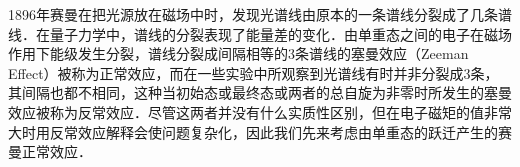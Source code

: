 
\begin{issues}
\issueTODO
\end{issues}


1896年赛曼在把光源放在磁场中时，发现光谱线由原本的一条谱线分裂成了几条谱线．在量子力学中，谱线的分裂表现了能量差的变化．由单重态之间的电子在磁场作用下能级发生分裂，谱线分裂成间隔相等的3条谱线的塞曼效应（Zeeman Effect）被称为正常效应，而在一些实验中所观察到光谱线有时并非分裂成3条，其间隔也都不相同，这种当初始态或最终态或两者的总自旋为非零时所发生的塞曼效应被称为反常效应．尽管这两者并没有什么实质性区别，但在电子磁矩的值非常大时用反常效应解释会使问题复杂化，因此我们先来考虑由单重态的跃迁产生的赛曼正常效应．

